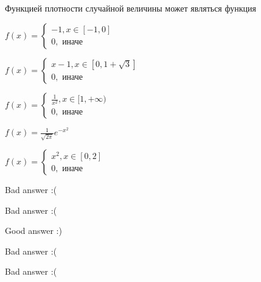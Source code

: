 
\begin{question}
Функцией плотности случайной величины может являться функция
\begin{answerlist}
  \item \(f(x) = \begin{cases} -1, x \in [-1, 0] \\ 0,\text{ иначе} \end{cases}\)
  \item \(f(x) = \begin{cases} x - 1, x \in [0,1+\sqrt{3}] \\ 0,\text{ иначе} \end{cases}\)
  \item \(f(x) = \begin{cases} \frac{1}{x^2}, x \in [1,+ \infty) \\ 0,\text{ иначе} \end{cases}\)
  \item \(f(x) = \frac{1}{\sqrt{2\pi}} e^{-x^2}\)
  \item \(f(x) = \begin{cases} x^2, x \in [0,2] \\ 0,\text{ иначе} \end{cases}\)
\end{answerlist}
\end{question}

\begin{solution}
\begin{answerlist}
  \item Bad answer :(
  \item Bad answer :(
  \item Good answer :)
  \item Bad answer :(
  \item Bad answer :(
\end{answerlist}
\end{solution}

